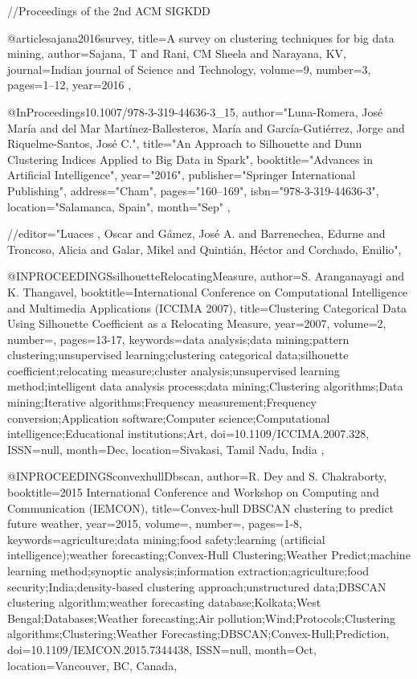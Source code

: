 

//Proceedings of the 2nd ACM SIGKDD

@article{sajana2016survey,
  title={A survey on clustering techniques for big data mining},
  author={Sajana, T and Rani, CM Sheela and Narayana, KV},
  journal={Indian journal of Science and Technology},
  volume={9},
  number={3},
  pages={1--12},
  year={2016}
},

@InProceedings{10.1007/978-3-319-44636-3_15,
author="Luna-Romera, Jos{\'e} Mar{\'i}a
and del Mar Mart{\'i}nez-Ballesteros, Mar{\'i}a
and Garc{\'i}a-Guti{\'e}rrez, Jorge
and Riquelme-Santos, Jos{\'e} C.",
title="An Approach to Silhouette and Dunn Clustering Indices Applied to Big Data in Spark",
booktitle="Advances in Artificial Intelligence",
year="2016",
publisher="Springer International Publishing",
address="Cham",
pages="160--169",
isbn="978-3-319-44636-3",
location="Salamanca, Spain",
month="Sep"
},

//editor="Luaces , Oscar
and G{\'a}mez, Jos{\'e} A.
and Barrenechea, Edurne
and Troncoso, Alicia
and Galar, Mikel
and Quinti{\'a}n, H{\'e}ctor
and Corchado, Emilio",

@INPROCEEDINGS{silhouetteRelocatingMeasure, 
author={S. {Aranganayagi} and K. {Thangavel}}, 
booktitle={International Conference on Computational Intelligence and Multimedia Applications (ICCIMA 2007)}, 
title={Clustering Categorical Data Using Silhouette Coefficient as a Relocating Measure}, 
year={2007}, 
volume={2}, 
number={}, 
pages={13-17}, 
keywords={data analysis;data mining;pattern clustering;unsupervised learning;clustering categorical data;silhouette coefficient;relocating measure;cluster analysis;unsupervised learning method;intelligent data analysis process;data mining;Clustering algorithms;Data mining;Iterative algorithms;Frequency measurement;Frequency conversion;Application software;Computer science;Computational intelligence;Educational institutions;Art}, 
doi={10.1109/ICCIMA.2007.328}, 
ISSN={null}, 
month={Dec},
location={Sivakasi, Tamil Nadu, India }},

@INPROCEEDINGS{convexhullDbscan, 
author={R. {Dey} and S. {Chakraborty}}, 
booktitle={2015 International Conference and Workshop on Computing and Communication (IEMCON)}, 
title={Convex-hull DBSCAN clustering to predict future weather}, 
year={2015}, 
volume={}, 
number={}, 
pages={1-8}, 
keywords={agriculture;data mining;food safety;learning (artificial intelligence);weather forecasting;Convex-Hull Clustering;Weather Predict;machine learning method;synoptic analysis;information extraction;agriculture;food security;India;density-based clustering approach;unstructured data;DBSCAN clustering algorithm;weather forecasting database;Kolkata;West Bengal;Databases;Weather forecasting;Air pollution;Wind;Protocols;Clustering algorithms;Clustering;Weather Forecasting;DBSCAN;Convex-Hull;Prediction}, 
doi={10.1109/IEMCON.2015.7344438}, 
ISSN={null}, 
month={Oct},
location={Vancouver, BC, Canada}},


